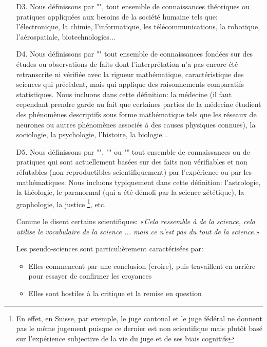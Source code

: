 \begin{itemize}
	\item[D3.] Nous définissons par "", tout ensemble de connaissances théoriques ou pratiques appliquées aux besoins de la société humaine tels que: l'électronique, la chimie, l'informatique, les télécommunications, la robotique, l'aérospatiale, biotechnologies...

	\item[D4.] Nous définissons par "" tout ensemble de connaissances fondées sur des études ou observations de faits dont l'interprétation n'a pas encore été retranscrite ni vérifiée avec la rigueur mathématique, caractéristique des sciences qui précèdent, mais qui applique des raisonnements comparatifs statistiques. Nous incluons dans cette définition: la médecine (il faut cependant prendre garde au fait que certaines parties de la médecine étudient des phénomènes descriptifs sous forme mathématique tels que les réseaux de neurones ou autres phénomènes associés à des causes physiques connues), la sociologie, la psychologie, l'histoire, la biologie...

	\item[D5.] Nous définissons par "", "" ou "" tout ensemble de connaissances ou de pratiques qui sont actuellement basées sur des faits non vérifiables et non réfutables (non reproductibles scientifiquement) par l'expérience ou par les mathématiques. Nous incluons typiquement dans cette définition: l'astrologie, la théologie, le paranormal (qui a été démoli par la science zététique), la graphologie, la justice \footnote{En effet, en Suisse, par exemple, le juge cantonal et le juge fédéral ne donnent pas le même jugement puisque ce dernier est non scientifique mais plutôt basé sur l'expérience subjective de la vie du juge et de ses biais cognitifs}, etc.
	
	Comme le disent certains scientifiques: «\textit{Cela ressemble à de la science, cela utilise le vocabulaire de la science ... mais ce n'est pas du tout de la science.}»
	
	Les pseudo-sciences sont particulièrement caractérisées par:
	\begin{itemize}
		\item Elles commencent par une conclusion (croire), puis travaillent en arrière pour essayer de confirmer les croyances

		\item Elles sont hostiles à la critique et la remise en question


\end{itemize}
\end{itemize}
